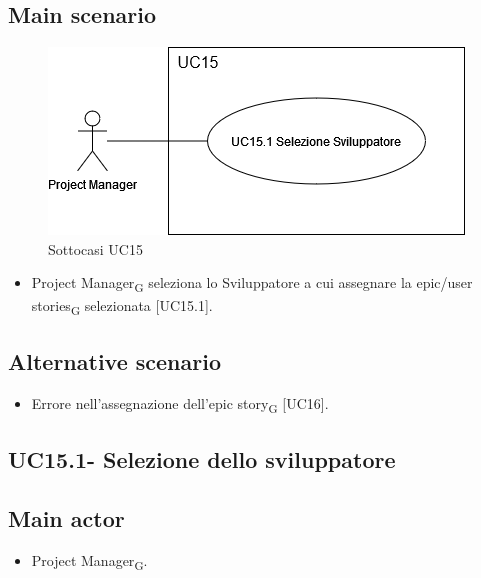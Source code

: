 \documentclass{article}
\begin{document}
    \subsection*{Main scenario}
        \begin{figure}[h]
          \centering
          \includegraphics[width=.8\textwidth, height=.6\textheight, keepaspectratio]{documenti/imgUML/UC15-zoom.drawio.png}
          \caption{Sottocasi UC15}
          \label{fig:UC15_sottocasi}
        \end{figure}
        
        \begin{itemize}
            \item Project Manager\textsubscript{G} seleziona lo Sviluppatore a cui assegnare la epic/user stories\textsubscript{G} selezionata [UC15.1].
        \end{itemize}
        
    \subsection*{Alternative scenario}
        \begin{itemize}
            \item Errore nell'assegnazione dell'epic story\textsubscript{G} [UC16].
        \end{itemize}    
        
    \subsection{UC15.1- Selezione dello sviluppatore}
        \subsection*{Main actor}
    \begin{itemize}
        \item Project Manager\textsubscript{G}.
    \end{itemize}
    
\end{document}
